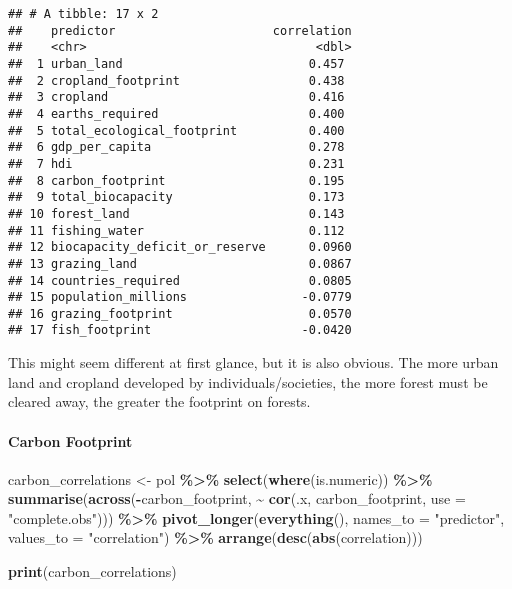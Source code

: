 \documentclass[
]{article}
\newenvironment{Shaded}{\begin{snugshade}}{\end{snugshade}}
\newcommand{\AttributeTok}[1]{\textcolor[rgb]{0.13,0.29,0.53}{#1}}
\newcommand{\FunctionTok}[1]{\textcolor[rgb]{0.13,0.29,0.53}{\textbf{#1}}}
\newcommand{\NormalTok}[1]{#1}
\newcommand{\OtherTok}[1]{\textcolor[rgb]{0.56,0.35,0.01}{#1}}
\newcommand{\SpecialCharTok}[1]{\textcolor[rgb]{0.81,0.36,0.00}{\textbf{#1}}}
\newcommand{\StringTok}[1]{\textcolor[rgb]{0.31,0.60,0.02}{#1}}
\begin{document}
\begin{verbatim}
## # A tibble: 17 x 2
##    predictor                      correlation
##    <chr>                                <dbl>
##  1 urban_land                          0.457 
##  2 cropland_footprint                  0.438 
##  3 cropland                            0.416 
##  4 earths_required                     0.400 
##  5 total_ecological_footprint          0.400 
##  6 gdp_per_capita                      0.278 
##  7 hdi                                 0.231 
##  8 carbon_footprint                    0.195 
##  9 total_biocapacity                   0.173 
## 10 forest_land                         0.143 
## 11 fishing_water                       0.112 
## 12 biocapacity_deficit_or_reserve      0.0960
## 13 grazing_land                        0.0867
## 14 countries_required                  0.0805
## 15 population_millions                -0.0779
## 16 grazing_footprint                   0.0570
## 17 fish_footprint                     -0.0420
\end{verbatim}

This might seem different at first glance, but it is also obvious. The
more urban land and cropland developed by individuals/societies, the
more forest must be cleared away, the greater the footprint on forests.

\paragraph{Carbon Footprint}\label{carbon-footprint}

\begin{Shaded}
\begin{Highlighting}[]
\NormalTok{carbon\_correlations }\OtherTok{\textless{}{-}}\NormalTok{ pol }\SpecialCharTok{\%\textgreater{}\%}
  \FunctionTok{select}\NormalTok{(}\FunctionTok{where}\NormalTok{(is.numeric)) }\SpecialCharTok{\%\textgreater{}\%}
  \FunctionTok{summarise}\NormalTok{(}\FunctionTok{across}\NormalTok{(}\SpecialCharTok{{-}}\NormalTok{carbon\_footprint, }
                   \SpecialCharTok{\textasciitilde{}} \FunctionTok{cor}\NormalTok{(.x, carbon\_footprint, }\AttributeTok{use =} \StringTok{"complete.obs"}\NormalTok{))) }\SpecialCharTok{\%\textgreater{}\%}
  \FunctionTok{pivot\_longer}\NormalTok{(}\FunctionTok{everything}\NormalTok{(), }\AttributeTok{names\_to =} \StringTok{"predictor"}\NormalTok{, }\AttributeTok{values\_to =} \StringTok{"correlation"}\NormalTok{) }\SpecialCharTok{\%\textgreater{}\%}
  \FunctionTok{arrange}\NormalTok{(}\FunctionTok{desc}\NormalTok{(}\FunctionTok{abs}\NormalTok{(correlation)))}

\FunctionTok{print}\NormalTok{(carbon\_correlations)}
\end{Highlighting}
\end{Shaded}
\end{document}
